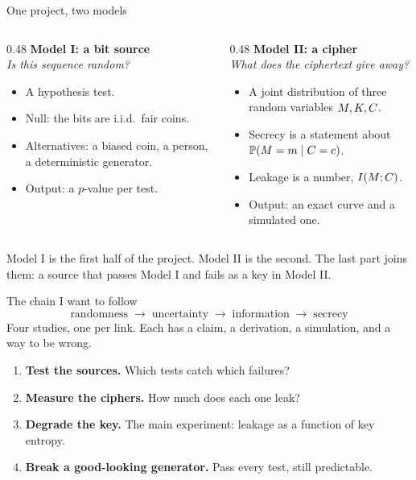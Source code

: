 \documentclass[10pt,aspectratio=169]{beamer}
\begin{document}
\begin{frame}{One project, two models}
  \begin{columns}[T]
    \begin{column}{0.48\textwidth}
      \textbf{Model I: a bit source}\\
      \emph{Is this sequence random?}
      \medskip
      \begin{itemize}
        \item A hypothesis test.
        \item Null: the bits are i.i.d.\ fair coins.
        \item Alternatives: a biased coin, a person, a deterministic
              generator.
        \item Output: a $p$-value per test.
      \end{itemize}
    \end{column}
    \begin{column}{0.48\textwidth}
      \textbf{Model II: a cipher}\\
      \emph{What does the ciphertext give away?}
      \medskip
      \begin{itemize}
        \item A joint distribution of three random variables
              $M, K, C$.
        \item Secrecy is a statement about
              $\mathbb{P}\!\left(M = m \mid C = c\right)$.
        \item Leakage is a number, $I\!\left(M ; C\right)$.
        \item Output: an exact curve and a simulated one.
      \end{itemize}
    \end{column}
  \end{columns}
  \medskip
  Model I is the first half of the project. Model II is the second. The
  last part joins them: a source that passes Model I and fails as a key
  in Model II.
\end{frame}

\begin{frame}{The chain I want to follow}
  \[
    \text{randomness} \;\to\; \text{uncertainty} \;\to\;
    \text{information} \;\to\; \text{secrecy}
  \]
  Four studies, one per link. Each has a claim, a derivation, a
  simulation, and a way to be wrong.
  \medskip
  \begin{enumerate}
    \item \textbf{Test the sources.} Which tests catch which failures?
    \item \textbf{Measure the ciphers.} How much does each one leak?
    \item \textbf{Degrade the key.} The main experiment: leakage as a
          function of key entropy.
    \item \textbf{Break a good-looking generator.} Pass every test,
          still predictable.
  \end{enumerate}
\end{frame}
\end{document}
